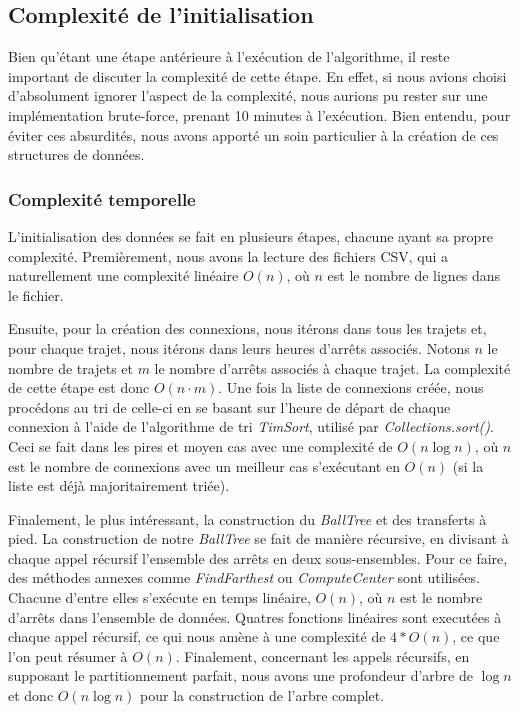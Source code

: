 \documentclass[12pt]{article}
\begin{document}
\newpage
\subsection{Complexité de l'initialisation}
Bien qu'étant une étape antérieure à l'exécution de l'algorithme, il reste important de discuter la complexité de cette étape. En effet, si nous avions choisi d'absolument ignorer
l'aspect de la complexité, nous aurions pu rester sur une implémentation brute-force, prenant 10 minutes à l'exécution. Bien entendu, pour éviter ces absurdités, nous avons apporté
un soin particulier à la création de ces structures de données.

\subsubsection{Complexité temporelle}
L'initialisation des données se fait en plusieurs étapes, chacune ayant sa propre complexité. Premièrement, nous avons la lecture des fichiers CSV, qui a naturellement une complexité
linéaire $O(n)$, où $n$ est le nombre de lignes dans le fichier. 

Ensuite, pour la création des connexions, nous itérons dans tous les trajets et, pour chaque trajet, nous itérons dans leurs heures d'arrêts associés. Notons $n$ le nombre de trajets et $m$ le 
nombre d'arrêts associés à chaque trajet. La complexité de cette étape est donc $O(n \cdot m)$. Une fois la liste de connexions créée, nous procédons au tri de celle-ci en se basant sur 
l'heure de départ de chaque connexion à l'aide de l'algorithme de tri \emph{TimSort}, utilisé par \emph{Collections.sort()}. Ceci se fait dans les pires et
moyen cas avec une complexité de $O(n \log n)$, où $n$ est le nombre de connexions avec un meilleur cas s'exécutant en $O(n)$ (si la liste est déjà majoritairement triée).

Finalement, le plus intéressant, la construction du \emph{BallTree} et des transferts à pied. La construction de notre \emph{BallTree} se fait de manière récursive, en divisant à chaque appel 
récursif l'ensemble des arrêts en deux sous-ensembles. Pour ce faire, des méthodes annexes comme \emph{FindFarthest} ou \emph{ComputeCenter} sont utilisées. Chacune d'entre elles s'exécute en 
temps linéaire, $O(n)$, où $n$ est le nombre d'arrêts dans l'ensemble de données. Quatres fonctions linéaires sont executées à chaque appel récursif, ce qui nous amène à une complexité de 
$4 * O(n)$, ce que l'on peut résumer à $O(n)$. Finalement, concernant les appels récursifs, en supposant le partitionnement parfait, nous avons une profondeur d'arbre de $\log n$ et donc 
$O(n \log n)$ pour la construction de l'arbre complet.
\end{document}
